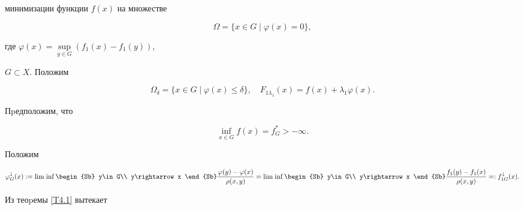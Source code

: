 минимизации функции $f(x)$ на множестве


$$


\Omega=\{x \in G\mid \varphi(x)=0\},


$$


где $\varphi(x)= \sup\limits_{y\in G}(f_1(x)-f_1(y))$,


$G\subset X$. Положим


$$


\Omega_\delta=\{x\in G\mid \varphi(x)\leq \delta\},\quad F_{1\lambda_1}(x)=


f(x)+\lambda_1\varphi(x).


$$


Пpедположим, что


$$


\inf_{x\in G}f(x)=f^*_G>-\infty.


$$


Положим


$$




\varphi_G^{\downarrow}(x):= \Liminf \limits \begin{Sb} y\in


G\\ y\rightarrow x \end{Sb} \frac{\varphi(y) -\varphi(x)}{\rho(x,y)}=


\Liminf \limits \begin{Sb} y\in


G\\ y\rightarrow x \end{Sb} \frac{f_1(y) -f_1(x)}{\rho(x,y)}=:


f_{1G}^{\downarrow}(x).




$$


Из теоpемы \ref{T4.1} вытекает





